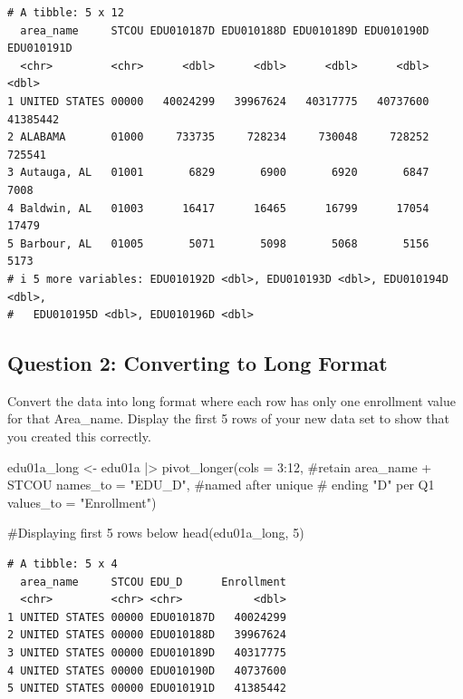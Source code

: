 \documentclass[
  letterpaper,
  DIV=11,
  numbers=noendperiod]{scrartcl}
\newenvironment{Shaded}{\begin{snugshade}}{\end{snugshade}}
\newcommand{\AttributeTok}[1]{\textcolor[rgb]{0.40,0.45,0.13}{#1}}
\newcommand{\CommentTok}[1]{\textcolor[rgb]{0.37,0.37,0.37}{#1}}
\newcommand{\DecValTok}[1]{\textcolor[rgb]{0.68,0.00,0.00}{#1}}
\newcommand{\FunctionTok}[1]{\textcolor[rgb]{0.28,0.35,0.67}{#1}}
\newcommand{\NormalTok}[1]{\textcolor[rgb]{0.00,0.23,0.31}{#1}}
\newcommand{\OtherTok}[1]{\textcolor[rgb]{0.00,0.23,0.31}{#1}}
\newcommand{\SpecialCharTok}[1]{\textcolor[rgb]{0.37,0.37,0.37}{#1}}
\newcommand{\StringTok}[1]{\textcolor[rgb]{0.13,0.47,0.30}{#1}}
\begin{document}
\begin{verbatim}
# A tibble: 5 x 12
  area_name     STCOU EDU010187D EDU010188D EDU010189D EDU010190D EDU010191D
  <chr>         <chr>      <dbl>      <dbl>      <dbl>      <dbl>      <dbl>
1 UNITED STATES 00000   40024299   39967624   40317775   40737600   41385442
2 ALABAMA       01000     733735     728234     730048     728252     725541
3 Autauga, AL   01001       6829       6900       6920       6847       7008
4 Baldwin, AL   01003      16417      16465      16799      17054      17479
5 Barbour, AL   01005       5071       5098       5068       5156       5173
# i 5 more variables: EDU010192D <dbl>, EDU010193D <dbl>, EDU010194D <dbl>,
#   EDU010195D <dbl>, EDU010196D <dbl>
\end{verbatim}

\subsection{Question 2: Converting to Long
Format}\label{question-2-converting-to-long-format}

Convert the data into long format where each row has only one enrollment
value for that Area\_name. Display the first 5 rows of your new data set
to show that you created this correctly.

\begin{Shaded}
\begin{Highlighting}[]
\NormalTok{edu01a\_long }\OtherTok{\textless{}{-}}\NormalTok{ edu01a }\SpecialCharTok{|\textgreater{}}
                  \FunctionTok{pivot\_longer}\NormalTok{(}\AttributeTok{cols =} \DecValTok{3}\SpecialCharTok{:}\DecValTok{12}\NormalTok{, }\CommentTok{\#retain area\_name + STCOU}
                               \AttributeTok{names\_to =} \StringTok{"EDU\_D"}\NormalTok{, }\CommentTok{\#named after unique}
                               \CommentTok{\# ending "D" per Q1}
                               \AttributeTok{values\_to =} \StringTok{"Enrollment"}\NormalTok{)}

\CommentTok{\#Displaying first 5 rows below}
\FunctionTok{head}\NormalTok{(edu01a\_long, }\DecValTok{5}\NormalTok{) }
\end{Highlighting}
\end{Shaded}

\begin{verbatim}
# A tibble: 5 x 4
  area_name     STCOU EDU_D      Enrollment
  <chr>         <chr> <chr>           <dbl>
1 UNITED STATES 00000 EDU010187D   40024299
2 UNITED STATES 00000 EDU010188D   39967624
3 UNITED STATES 00000 EDU010189D   40317775
4 UNITED STATES 00000 EDU010190D   40737600
5 UNITED STATES 00000 EDU010191D   41385442
\end{verbatim}
\end{document}
